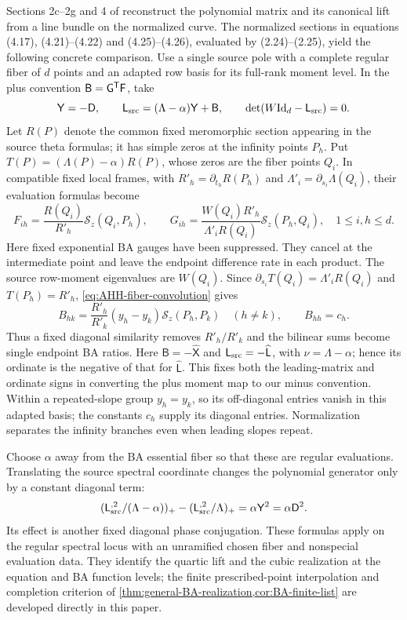 Sections 2c--2g and 4 of \cite{AdamsHarnadHurtubise1990II} reconstruct
the polynomial matrix and its canonical lift from a line bundle on
the normalized curve. The normalized sections in equations
(4.17), (4.21)--(4.22) and (4.25)--(4.26), evaluated by
(2.24)--(2.25), yield the following concrete comparison. Use a single
source pole with a complete regular fiber of $d$ points and an
adapted row basis for its full-rank moment level. In the plus
convention $\mathsf B=\mathsf G^{\mathsf T}\mathsf F$, take
\[
 \mathsf Y=-\mathsf D,\qquad
 \mathsf L_{\rm src}=(\Lambda-\alpha)\mathsf Y+\mathsf B,
 \qquad \det(W\mathrm{Id}_d-\mathsf L_{\rm src})=0.
\]
Let $R(P)$ denote the common fixed meromorphic section appearing in
the source theta formulas; it has simple zeros at the infinity
points $P_h$. Put $T(P)=(\Lambda(P)-\alpha)R(P)$, whose zeros
are the fiber points $Q_i$. In compatible fixed local frames,
with $R'_h=\partial_{t_h}R(P_h)$ and
$\Lambda'_i=\partial_{s_i}\Lambda(Q_i)$, their evaluation formulas
become
\begin{equation}\label{eq:AHH-evaluation-dictionary}
 F_{ih}=\frac{R(Q_i)}{R'_h}\mathscr S_z(Q_i,P_h),\qquad
 G_{ih}=\frac{W(Q_i)R'_h}{\Lambda'_iR(Q_i)}
                 \mathscr S_z(P_h,Q_i),\quad1\leq i,h\leq d.
\end{equation}
Here fixed exponential BA gauges have been suppressed. They cancel
at the intermediate point and leave the endpoint difference rate
in each product. The source row-moment eigenvalues are $W(Q_i)$.
Since $\partial_{s_i}T(Q_i)=\Lambda'_iR(Q_i)$ and $T(P_h)=R'_h$,
\cref{eq:AHH-fiber-convolution} gives
\begin{equation}\label{eq:AHH-BA-projection}
 B_{hk}=\frac{R'_h}{R'_k}(y_h-y_k)\mathscr S_z(P_h,P_k)
 \quad(h\ne k),\qquad B_{hh}=c_h.
\end{equation}
Thus a fixed diagonal similarity removes $R'_h/R'_k$ and the
bilinear sums become single endpoint BA ratios. Here $\mathsf B=-\widehat{\mathsf X}$ and
$\mathsf L_{\rm src}=-\widehat{\mathsf L}$, with
$\nu=\Lambda-\alpha$; hence its ordinate is the negative of
that for $\widehat{\mathsf L}$. This fixes both the leading-matrix
and ordinate signs in converting the plus moment map to our minus
convention. Within a repeated-slope group
$y_h=y_k$, so its off-diagonal entries vanish in this adapted basis;
the constants $c_h$ supply its diagonal entries. Normalization
separates the infinity branches even when leading slopes repeat.

Choose $\alpha$ away from the BA essential fiber so that these are
regular evaluations. Translating the source spectral coordinate
changes the polynomial generator only by a constant diagonal term:
\[
 (\mathsf L_{\rm src}^{,2}/(\Lambda-\alpha))_+
 -(\mathsf L_{\rm src}^{,2}/\Lambda)_+=\alpha\mathsf Y^2=\alpha\mathsf D^2.
\]
Its effect is another fixed diagonal phase conjugation. These
formulas apply on the regular spectral locus with an unramified
chosen fiber and nonspecial evaluation data. They identify the
quartic lift and the cubic realization at the equation and BA
function levels; the finite prescribed-point interpolation and
completion criterion of \cref{thm:general-BA-realization,cor:BA-finite-list}
are developed directly in this paper.
